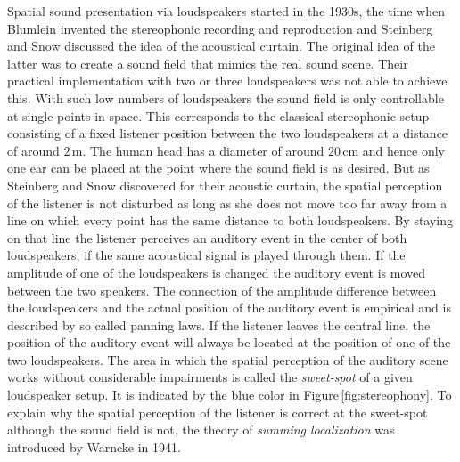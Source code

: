 \documentclass[a4paper]{book}
\begin{document}
Spatial sound presentation via loudspeakers started in the 1930s, the time when
Blumlein invented the stereophonic recording and
reproduction\cite{Blumlein1958} and Steinberg and Snow discussed the idea of
the acoustical curtain.\cite{Steinberg1934}
The original idea of the latter was to create a sound field that mimics the real sound
scene. Their practical implementation with two or three loudspeakers was not able
to achieve this. With such low numbers of loudspeakers the sound field is only
controllable at single points in space. This corresponds to the classical
stereophonic setup consisting of a fixed listener position between the two
loudspeakers at a distance of around $2$\,m.
The human head has a diameter of around $20$\,cm and hence only one ear can
be placed at the point where the sound field is as desired. But as Steinberg and
Snow discovered for their acoustic curtain, the spatial perception of the
listener is not disturbed as long as she does not move too far away from a line
on which every point has the same distance to both loudspeakers.
By staying on that line the listener perceives an
auditory event in the center of both loudspeakers, if the same acoustical signal
is played through them. If the amplitude of one of the loudspeakers is changed
the auditory event is moved between the two speakers. The connection of the
amplitude difference between the loudspeakers and the actual position of the
auditory event is empirical and is described by so called panning
laws.\cite{Leakey1959}
If the listener leaves the central line, the position of the auditory event
will always be located at the position of one of the two loudspeakers. The area in which the
spatial perception of the auditory scene works without considerable impairments
is called the \emph{sweet-spot} of a given loudspeaker setup. It is indicated
by the blue color in Figure\,\ref{fig:stereophony}.
To explain why the spatial perception of the listener is correct at the
sweet-spot although the sound field is not, the theory of \emph{summing
localization} was introduced by Warncke in 1941.\cite[A discussion is
provided in][p.\,204]{Blauert1997}
\end{document}
